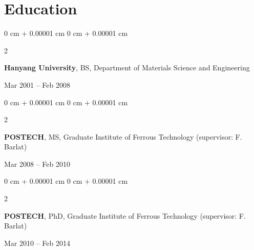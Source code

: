 \documentclass[10pt, letterpaper]{article}
\newenvironment{highlightsforbulletentries}{
    \begin{itemize}[
        topsep=0.10 cm,
        parsep=0.10 cm,
        partopsep=0pt,
        itemsep=0pt,
        leftmargin=10pt
    ]
}{
    \end{itemize}
} %
\newenvironment{onecolentry}{
    \begin{adjustwidth}{
        0 cm + 0.00001 cm
    }{
        0 cm + 0.00001 cm
    }
}{
    \end{adjustwidth}
} %
\newenvironment{twocolentry}[2][]{
    \onecolentry
    \def\secondColumn{#2}
    \setcolumnwidth{\fill, 4.5 cm}
    \begin{paracol}{2}
}{
    \switchcolumn \raggedleft \secondColumn
    \end{paracol}
    \endonecolentry
} %
\begin{document}

    \section{Education}
        \begin{twocolentry}{Mar 2001 – Feb 2008}
            \textbf{Hanyang University}, BS, Department of Materials Science and Engineering
        \end{twocolentry}
        \vspace{0.10 cm}
        \begin{twocolentry}{Mar 2008 – Feb 2010}
            \textbf{POSTECH}, MS, Graduate Institute of Ferrous Technology (supervisor: F. Barlat)
        \end{twocolentry}
        \vspace{0.10 cm}
        \begin{twocolentry}{Mar 2010 – Feb 2014}
            \textbf{POSTECH}, PhD, Graduate Institute of Ferrous Technology (supervisor: F. Barlat)
        \end{twocolentry}
        \vspace{0.10 cm}
\end{document}
